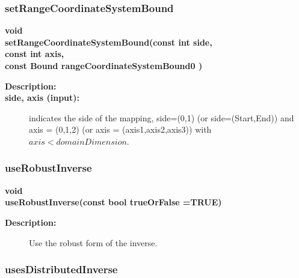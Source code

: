 \subsubsection{setRangeCoordinateSystemBound}
 
\begin{flushleft} \textbf{%
void  \\ 
\settowidth{\MappingIncludeArgIndent}{setRangeCoordinateSystemBound(}%
setRangeCoordinateSystemBound(const int side, \\ 
\hspace{\MappingIncludeArgIndent}const int axis, \\ 
\hspace{\MappingIncludeArgIndent}const Bound rangeCoordinateSystemBound0 )
}\end{flushleft}
\begin{description}
\item[{\bf Description:}] 
\item[{\bf side, axis (input):}]  indicates the side of the mapping, side=(0,1) (or side=(Start,End)) 
     and axis = (0,1,2) (or axis = (axis1,axis2,axis3)) with $axis<domainDimension$.
\end{description}
\subsubsection{useRobustInverse}
 
\begin{flushleft} \textbf{%
void  \\ 
\settowidth{\MappingIncludeArgIndent}{useRobustInverse(}%
useRobustInverse(const bool trueOrFalse  =TRUE)
}\end{flushleft}
\begin{description}
\item[{\bf Description:}] 
    Use the robust form of the inverse.
\end{description}
\subsubsection{usesDistributedInverse}
 
